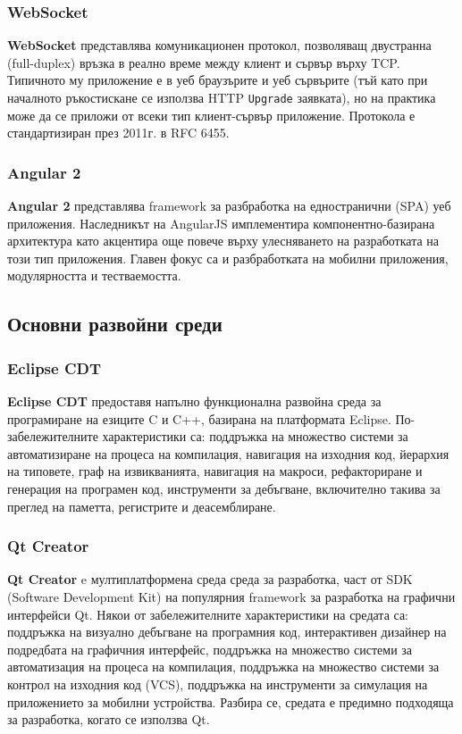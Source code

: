 \documentclass[12pt,a4paper,oneside]{book}
\begin{document}
\subsubsection{WebSocket}

\textbf{WebSocket} представлява комуникационен протокол, позволяващ двустранна
(full-duplex) връзка в реално време между клиент и сървър върху TCP. Типичното му
приложение е в уеб браузърите и уеб сървърите (тъй като при началното ръкостискане се използва
HTTP \texttt{Upgrade} заявката), но на практика може да се приложи от всеки тип
клиент-сървър приложение. Протокола е стандартизиран през 2011г. в RFC 6455.

\subsubsection{Angular 2}

\textbf{Angular 2} представлява framework за разбработка на едностранични
(SPA) уеб приложения. Наследникът на AngularJS имплементира компонентно-базирана
архитектура като акцентира още повече върху улесняването на разработката на този тип
приложения. Главен фокус са и разбработката на мобилни приложения, модулярността и
тестваемостта.

\subsection{Основни развойни среди}

\subsubsection{Eclipse CDT}

\textbf{Eclipse CDT} предоставя напълно функционална развойна среда за програмиране на
езиците C и C++, базирана на платформата Eclipse. По-забележителните
характеристики са: поддръжка на множество системи за автоматизиране на процеса
на компилация, навигация на изходния код, йерархия на типовете, граф на
извикванията, навигация на макроси, рефакториране и генерация на програмен код,
инструменти за дебъгване, включително такива за преглед на паметта, регистрите и
деасемблиране.

\subsubsection{Qt Creator}

\textbf{Qt Creator} e мултиплатформена среда среда за разработка, част от
SDK (Software Development Kit) на популярния framework за разработка на графични
интерфейси Qt. Някои от забележителните характеристики на средата са: поддръжка
на визуално дебъгване на програмния код, интерактивен дизайнер на подредбата на
графичния интерфейс, поддръжка на множество системи за автоматизация на процеса
на компилация, поддръжка на множество системи за контрол на изходния код (VCS),
поддръжка на инструменти за симулация на приложението за мобилни устройства.
Разбира се, средата е предимно подходяща за разработка, когато се използва Qt.
\end{document}
